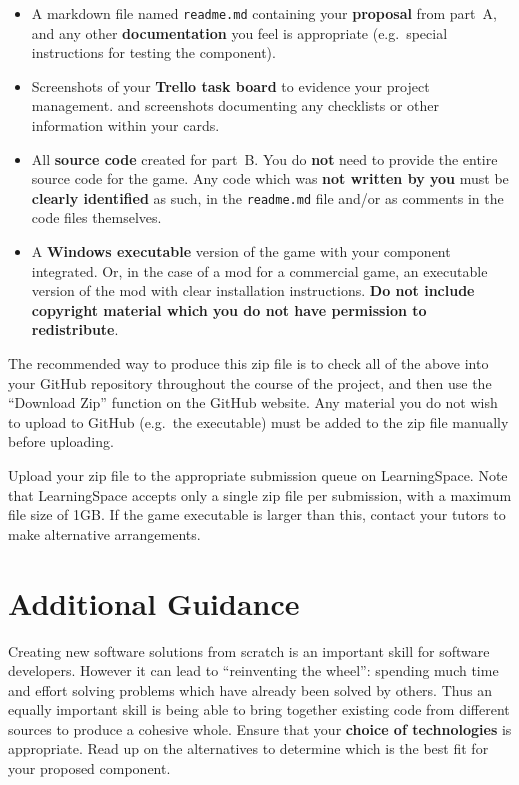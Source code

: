 \documentclass{../fal_assignment}
\begin{document}
\begin{itemize}
\item A markdown file named \texttt{readme.md} containing your \textbf{proposal} from part~A,
    and any other \textbf{documentation} you feel is appropriate
    (e.g.\ special instructions for testing the component).
\item Screenshots of your \textbf{Trello task board} to evidence your project management.
    and screenshots documenting any checklists or other information within your cards.
\item All \textbf{source code} created for part~B.
    You do \textbf{not} need to provide the entire source code for the game.
    Any code which was \textbf{not written by you} must be \textbf{clearly identified} as such,
    in the \texttt{readme.md} file and/or as comments in the code files themselves.
\item A \textbf{Windows executable} version of the game with your component integrated.
    Or, in the case of a mod for a commercial game, an executable version of the mod with clear installation instructions.
    \textbf{Do not include copyright material which you do not have permission to redistribute}.
\end{itemize}

The recommended way to produce this zip file is to check all of the above into your GitHub repository
throughout the course of the project,
and then use the ``Download Zip'' function on the GitHub website.
Any material you do not wish to upload to GitHub (e.g.\ the executable)
must be added to the zip file manually before uploading.

Upload your zip file to the appropriate submission queue on LearningSpace.
Note that LearningSpace accepts only a single zip file per submission,
with a maximum file size of 1GB.
If the game executable is larger than this, contact your tutors to make alternative arrangements.

\section*{Additional Guidance}

Creating new software solutions from scratch is an important skill for software developers.
However it can lead to ``reinventing the wheel'': spending much time and effort solving problems which have already been solved by others.
Thus an equally important skill is being able to bring together existing code from different sources to produce a cohesive whole.
Ensure that your \textbf{choice of technologies} is appropriate.
Read up on the alternatives to determine which is the best fit for your proposed component.
\end{document}
